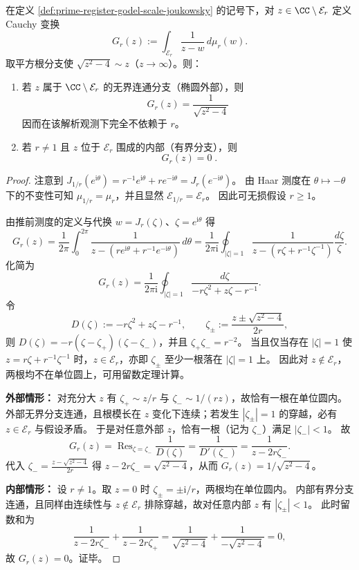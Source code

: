 \begin{theorem}\label{thm:prime-register-joukowsky-cauchy-rigidity}
在定义 \ref{def:prime-register-godel-scale-joukowsky} 的记号下，对 \(z\in\CC\setminus \mathcal E_r\) 定义 Cauchy 变换
\[
G_r(z):=\int_{\mathcal E_r}\frac{1}{z-w}\,d\mu_r(w).
\]
取平方根分支使 \(\sqrt{z^2-4}\sim z\)（\(z\to\infty\)）。则：
\begin{enumerate}
  \item 若 \(z\) 属于 \(\CC\setminus\mathcal E_r\) 的无界连通分支（椭圆外部），则
  \[
  \boxed{\;G_r(z)=\frac{1}{\sqrt{z^2-4}}\;}
  \]
  因而在该解析观测下完全不依赖于 \(r\)。
  \item 若 \(r\ne 1\) 且 \(z\) 位于 \(\mathcal E_r\) 围成的内部（有界分支），则
  \[
  \boxed{\;G_r(z)=0\; }.
  \]
\end{enumerate}
\end{theorem}
\begin{proof}
注意到
\(
J_{1/r}(e^{\mathrm{i}\theta})=r^{-1}e^{\mathrm{i}\theta}+r e^{-\mathrm{i}\theta}
=J_r(e^{-\mathrm{i}\theta})
\)。
由 Haar 测度在 \(\theta\mapsto-\theta\) 下的不变性可知 \(\mu_{1/r}=\mu_r\)，并且显然 \(\mathcal E_{1/r}=\mathcal E_r\)。
因此可无损假设 \(r\ge 1\)。
\par
由推前测度的定义与代换 \(w=J_r(\zeta)\)、\(\zeta=e^{\mathrm{i}\theta}\) 得
\[
G_r(z)
=\frac{1}{2\pi}\int_{0}^{2\pi}\frac{1}{z-(r e^{\mathrm{i}\theta}+r^{-1}e^{-\mathrm{i}\theta})}\,d\theta
=\frac{1}{2\pi\mathrm{i}}\oint_{|\zeta|=1}\frac{1}{z-(r\zeta+r^{-1}\zeta^{-1})}\frac{d\zeta}{\zeta}.
\]
化简为
\[
G_r(z)=\frac{1}{2\pi\mathrm{i}}\oint_{|\zeta|=1}\frac{d\zeta}{-r\zeta^2+z\zeta-r^{-1}}.
\]
令
\[
D(\zeta):=-r\zeta^2+z\zeta-r^{-1},
\qquad
\zeta_{\pm}:=\frac{z\pm\sqrt{z^2-4}}{2r},
\]
则 \(D(\zeta)=-r(\zeta-\zeta_+)(\zeta-\zeta_-)\)，并且 \(\zeta_+\zeta_-=r^{-2}\)。
当且仅当存在 \(|\zeta|=1\) 使 \(z=r\zeta+r^{-1}\zeta^{-1}\) 时，\(z\in\mathcal E_r\)，亦即 \(\zeta_\pm\) 至少一根落在 \(|\zeta|=1\) 上。
因此对 \(z\notin\mathcal E_r\)，两根均不在单位圆上，可用留数定理计算。
\par
\textbf{外部情形：}
对充分大 \(z\) 有 \(\zeta_+\sim z/r\) 与 \(\zeta_-\sim 1/(rz)\)，故恰有一根在单位圆内。
外部无界分支连通，且根模长在 \(z\) 变化下连续；若发生 \(|\zeta_\pm|=1\) 的穿越，必有 \(z\in\mathcal E_r\) 与假设矛盾。
于是对任意外部 \(z\)，恰有一根（记为 \(\zeta_-\)）满足 \(|\zeta_-|<1\)。
故
\[
G_r(z)=\operatorname{Res}_{\zeta=\zeta_-}\frac{1}{D(\zeta)}
=\frac{1}{D'(\zeta_-)}
=\frac{1}{z-2r\zeta_-}.
\]
代入 \(\zeta_-=\frac{z-\sqrt{z^2-4}}{2r}\) 得
\(
z-2r\zeta_-=\sqrt{z^2-4}
\)，从而 \(G_r(z)=1/\sqrt{z^2-4}\)。
\par
\textbf{内部情形：}
设 \(r\ne 1\)。取 \(z=0\) 时 \(\zeta_\pm=\pm \mathrm{i}/r\)，两根均在单位圆内。
内部有界分支连通，且同样由连续性与 \(z\notin\mathcal E_r\) 排除穿越，故对任意内部 \(z\) 有 \(|\zeta_\pm|<1\)。
此时留数和为
\[
\frac{1}{z-2r\zeta_-}+\frac{1}{z-2r\zeta_+}
=\frac{1}{\sqrt{z^2-4}}+\frac{1}{-\sqrt{z^2-4}}
=0,
\]
故 \(G_r(z)=0\)。证毕。
\end{proof}

